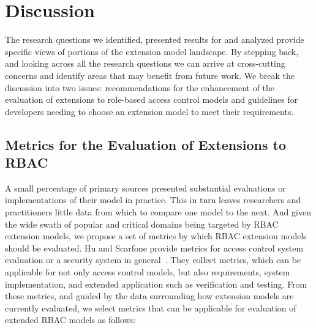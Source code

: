 \section{Discussion} \label{sec:discussion}

The research questions we identified, presented results for and analyzed provide specific views of portions of the extension model landscape. 
By stepping back, and looking across all the research questions we can arrive at cross-cutting concerns and identify areas that may benefit from future work.
We break the discussion into two issues: recommendations for the enhancement of the evaluation of extensions to role-based access control models and guidelines for developers needing to choose an extension model to meet their requirements.

\subsection{Metrics for the Evaluation of Extensions to RBAC}

A small percentage of primary sources presented substantial evaluations or implementations of their model in practice.  This in turn leaves researchers and practitioners little data from which to compare one model to the next. And given the wide swath of popular and critical domains being targeted by RBAC extension models, we propose a set of metrics by which RBAC extension models should be evaluated. Hu and Scarfone provide metrics for access control system evaluation or a security system in general~\cite{hu2012:NIST7874}. They collect metrics, which can be applicable for not only access control models, but also requirements, system implementation, and extended application such as verification and testing. From these metrics, and guided by the data surrounding how extension models are currently evaluated, we select metrics that can be applicable for evaluation of extended RBAC models as follows:

